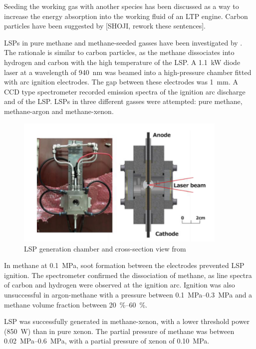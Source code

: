         Seeding the working gas with another species has been discussed as a way to increase the energy absorption into the working fluid of an LTP engine. Carbon particles have been suggested by [SHOJI, rework these sentences].

        LSPs in pure methane and methane-seeded gasses have been investigated by \textcite{kameiMethaneMethaneXenon2020}. The rationale is similar to carbon particles, as the methane dissociates into hydrogen and carbon with the high temperature of the LSP. A \qty{1.1}{kW} diode laser at a wavelength of \qty{940}{nm} was beamed into a high-pressure chamber fitted with arc ignition electrodes. The gap between these electrodes was \qty{1}{mm}. A CCD type spectrometer recorded emission spectra of the ignition arc discharge and of the LSP. LSPs in three different gasses were attempted: pure methane, methane-argon and methane-xenon.
        \begin{figure}[!ht]
            \centering
            \includegraphics[width=0.9\textwidth]{assets/2 background/Kamei apparatus.png}
            \caption{LSP generation chamber and cross-section view from \textcite{kameiMethaneMethaneXenon2020}}
            \label{fig:Kamei}
        \end{figure}
        In methane at \qty{0.1}{MPa}, soot formation between the electrodes prevented LSP ignition. The spectrometer confirmed the dissociation of methane, as line spectra of carbon and hydrogen were observed at the ignition arc. Ignition was also unsuccessful in argon-methane with a pressure between \qtyrange{0.1}{0.3}{MPa} and a methane volume fraction between \qtyrange{20}{60}{\%}. 
        
        LSP was successfully generated in methane-xenon, with a lower threshold power (\qty{850}{W}) than in pure xenon. The partial pressure of methane was between \qtyrange{0.02}{0.6}{MPa}, with a partial pressure of xenon of \qty{0.10}{MPa}.

